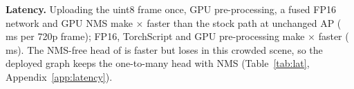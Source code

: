 \textbf{Latency.} Uploading the uint8 frame once, GPU pre-processing, a fused FP16 network and GPU NMS make \yolo{}
\SpeedupYolo$\times$ faster than the stock path at unchanged AP (\LatYoloDep\,ms per 720p frame); FP16, TorchScript and
GPU pre-processing make \rfdetr{} \SpeedupRf$\times$ faster (\LatRfDep\,ms). The NMS-free head of \yolo{} is faster but
loses \NmsFreeApLoss{} \AP{} in this crowded scene, so the deployed graph keeps the one-to-many head with NMS (Table~\ref{tab:lat},
Appendix~\ref{app:latency}).
